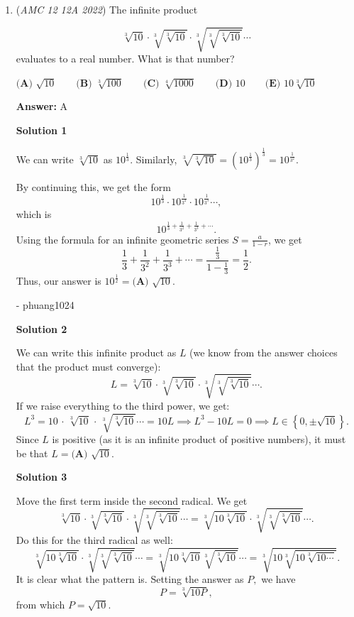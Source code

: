 \begin{enumerate}
 We can then sum up the possibilities of our two cases, which is $5\cdot4\cdot3\cdot3+5\cdot4\cdot3\cdot3\cdot2 = 5\cdot4\cdot3(3+3\cdot2) = 60\cdot9 = \boxed{\textbf{(D) }540}$



	\item (\textit{AMC 12 12A 2022}) The infinite product

 \[\sqrt[3]{10} \cdot \sqrt[3]{\sqrt[3]{10}} \cdot \sqrt[3]{\sqrt[3]{\sqrt[3]{10}}} \cdots\]
evaluates to a real number. What is that number?


 $\textbf{(A) }\sqrt{10}\qquad\textbf{(B) }\sqrt[3]{100}\qquad\textbf{(C) }\sqrt[4]{1000}\qquad\textbf{(D) }10\qquad\textbf{(E) }10\sqrt[3]{10}$

 \textbf{Answer: }A



\textbf{Solution 1}

We can write $\sqrt[3]{10}$ as $10 ^ \frac{1}{3}$. Similarly, $\sqrt[3]{\sqrt[3]{10}} = (10 ^ \frac{1}{3}) ^ \frac{1}{3} = 10 ^ \frac{1}{3^2}$.

 By continuing this, we get the form
 \[10 ^ \frac{1}{3} \cdot 10 ^ \frac{1}{3^2} \cdot 10 ^ \frac{1}{3^3} \cdots,\]which is
 \[10 ^ {\frac{1}{3} + \frac{1}{3^2} + \frac{1}{3^3} + \cdots}.\]Using the formula for an infinite geometric series $S = \frac{a}{1-r}$, we get
 \[\frac{1}{3} + \frac{1}{3^2} + \frac{1}{3^3} + \cdots = \frac{\frac{1}{3}}{1-\frac{1}{3}} = \frac{1}{2}.\]Thus, our answer is $10 ^ \frac{1}{2} = \boxed{\textbf{(A) }\sqrt{10}}$.

 - phuang1024

 



\textbf{Solution 2}

We can write this infinite product as $L$ (we know from the answer choices that the product must converge):
 \[L = \sqrt[3]{10} \cdot \sqrt[3]{\sqrt[3]{10}} \cdot \sqrt[3]{\sqrt[3]{\sqrt[3]{10}}} \cdots.\]If we raise everything to the third power, we get:
 \[L^3 =  10 \, \cdot \, \sqrt[3]{10} \, \cdot \, \sqrt[3]{\sqrt[3]{10}} \cdots = 10L \implies L^3 - 10L = 0 \implies L \in \left\{0, \pm \sqrt{10}\right\}.\]Since $L$ is positive (as it is an infinite product of positive numbers), it must be that $L = \boxed{\textbf{(A) }\sqrt{10}}.$




\textbf{Solution 3}

Move the first term inside the second radical. We get
 \[\sqrt[3]{10} \cdot \sqrt[3]{\sqrt[3]{10}} \cdot \sqrt[3]{\sqrt[3]{\sqrt[3]{10}}} \cdots = \sqrt[3]{10\sqrt[3]{10}} \cdot \sqrt[3]{\sqrt[3]{\sqrt[3]{10}}} \cdots.\]Do this for the third radical as well:
 \[\sqrt[3]{10\sqrt[3]{10}} \cdot \sqrt[3]{\sqrt[3]{\sqrt[3]{10}}} \cdots = \sqrt[3]{10\sqrt[3]{10}\sqrt[3]{\sqrt[3]{10}}} \cdots = \sqrt[3]{10\sqrt[3]{10\sqrt[3]{10\cdots}}}.\]It is clear what the pattern is. Setting the answer as $P,$ we have 
 \[P = \sqrt[3]{10P},\] from which $P = \boxed{\sqrt{10}}.$





\end{enumerate}
